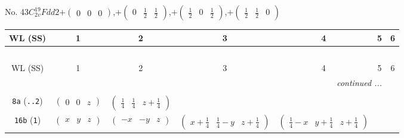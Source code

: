 \documentclass[fleqn,9pt,landscape]{jsarticle}
\begin{document}
\newpage
No. 43\quad$C_{2v}^{19}$\quad$Fdd2$\quad[ orthorhombic ]\quad$+\begin{pmatrix} 0 & 0 & 0 \end{pmatrix}$,\quad $+\begin{pmatrix} 0 & \frac{1}{2} & \frac{1}{2} \end{pmatrix}$,\quad $+\begin{pmatrix} \frac{1}{2} & 0 & \frac{1}{2} \end{pmatrix}$,\quad $+\begin{pmatrix} \frac{1}{2} & \frac{1}{2} & 0 \end{pmatrix}$
\begin{center}
\renewcommand{\arraystretch}{1.2}
\begin{longtable}{ccccccc}
 \hline \hline
WL (SS) & 1 & 2 & 3 & 4 & 5 & 6 \\ \hline \endfirsthead

\multicolumn{6}{l}{\tablename\ \thetable{}} \\
 \hline \hline
WL (SS) & 1 & 2 & 3 & 4 & 5 & 6 \\ \hline \endhead

 \hline \hline
\multicolumn{6}{r}{\footnotesize\it continued ...} \\ \endfoot

 \hline \hline
\multicolumn{6}{r}{} \\ \endlastfoot

{\tt 8a} ({\tt ..2}) & $ \begin{pmatrix} 0 & 0 & z \end{pmatrix} $ & $ \begin{pmatrix} \frac{1}{4} & \frac{1}{4} & z + \frac{1}{4} \end{pmatrix} $ & $  $ & $  $ \\ \hline
{\tt 16b} ({\tt 1}) & $ \begin{pmatrix} x & y & z \end{pmatrix} $ & $ \begin{pmatrix} - x & - y & z \end{pmatrix} $ & $ \begin{pmatrix} x + \frac{1}{4} & \frac{1}{4} - y & z + \frac{1}{4} \end{pmatrix} $ & $ \begin{pmatrix} \frac{1}{4} - x & y + \frac{1}{4} & z + \frac{1}{4} \end{pmatrix} $ \\
\end{longtable}
\end{center}
\end{document}
